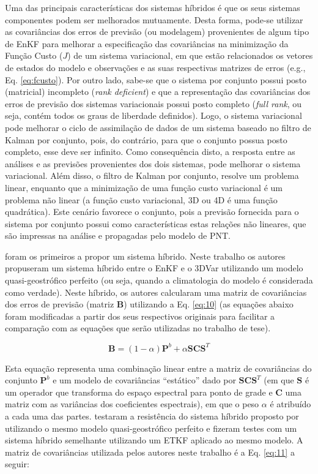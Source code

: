 Uma das principais características dos sistemas híbridos é que os seus sistemas componentes podem ser melhorados mutuamente. Desta forma, pode-se utilizar as covariâncias dos erros de previsão (ou modelagem) provenientes de algum tipo de EnKF para melhorar a especificação das covariâncias na minimização da Função Custo ($J$) de um sistema variacional, em que estão relacionados os vetores de estados do modelo e observações e as suas respectivas matrizes de erros (e.g., Eq. \ref{eq:fcusto}). Por outro lado, sabe-se que o sistema por conjunto possui posto (matricial) incompleto (\textit{rank deficient}) e que a representação das covariâncias dos erros de previsão dos sistemas variacionais possui posto completo (\textit{full rank}, ou seja, contém todos os graus de liberdade definidos). Logo, o sistema variacional pode melhorar o ciclo de assimilação de dados de um sistema baseado no filtro de Kalman por conjunto, pois, do contrário, para que o conjunto possua posto completo, esse deve ser infinito. Como consequência disto, a resposta entre as análises e as previsões provenientes dos dois sistemas, pode melhorar o sistema variacional. Além disso, o filtro de Kalman por conjunto, resolve um problema linear, enquanto que a minimização de uma função custo variacional é um problema não linear (a função custo variacional, 3D ou 4D é uma função quadrática). Este cenário favorece o conjunto, pois a previsão fornecida para o sistema por conjunto possui como características estas relações não lineares, que são impressas na análise e propagadas pelo modelo de PNT.

 foram os primeiros a propor um sistema híbrido. Neste trabalho os autores propuseram um sistema híbrido entre o EnKF e o 3DVar utilizando um modelo quasi-geostrófico perfeito (ou seja, quando a climatologia do modelo é considerada como verdade). Neste híbrido, os autores calcularam uma matriz de covariâncias dos erros de previsão (matriz $\mathbf{B}$) utilizando a Eq. \ref{eq:10} (as equações abaixo foram modificadas a partir dos seus respectivos originais para facilitar a comparação com as equações que serão utilizadas no trabalho de tese).

\begin{equation}
\label{eq:10}
\mathbf{B}=(1-\alpha)\mathbf{P}^{b}+\alpha\mathbf{SCS}^{T}
\end{equation}

Esta equação representa uma combinação linear entre a matriz de covariâncias do conjunto $\mathbf{P}^{b}$ e um modelo de covariâncias ``estático'' dado por $\mathbf{SCS}^{T}$ (em que $\mathbf{S}$ é um operador que transforma do espaço espectral para ponto de grade e $\mathbf{C}$ uma matriz com as variâncias dos coeficientes espectrais), em que o peso $\alpha$ é atribuído a cada uma das partes.  testaram a resistência do sistema híbrido proposto por  utilizando o mesmo modelo quasi-geostrófico perfeito e fizeram testes com um sistema híbrido semelhante utilizando um ETKF aplicado ao mesmo modelo. A matriz de covariâncias utilizada pelos autores neste trabalho  é a Eq. \ref{eq:11} a seguir: 

